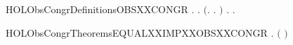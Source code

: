 \newcommand{\HOLObsCongrDate}{10 Settembre 2019}
\newcommand{\HOLObsCongrTime}{11:04}
\begin{SaveVerbatim}{HOLObsCongrDefinitionsOBSXXCONGR}
\HOLTokenTurnstile{} \HOLSymConst{\HOLTokenForall{}} .
          \HOLSymConst{\HOLTokenEquiv{}}
       \HOLSymConst{\HOLTokenForall{}}.
           \ensuremath{(}\HOLSymConst{\HOLTokenForall{}}.  \HOLTokenTransBegin{}\HOLTokenTransEnd {} \HOLSymConst{\HOLTokenImp{}} \HOLSymConst{\HOLTokenExists{}}.  \HOLTokenWeakTransBegin{}\HOLTokenWeakTransEnd {} \HOLSymConst{\HOLTokenConj{}}   \ensuremath{)} \HOLSymConst{\HOLTokenConj{}}
           \HOLSymConst{\HOLTokenForall{}}.  \HOLTokenTransBegin{}\HOLTokenTransEnd {} \HOLSymConst{\HOLTokenImp{}} \HOLSymConst{\HOLTokenExists{}}.  \HOLTokenWeakTransBegin{}\HOLTokenWeakTransEnd {} \HOLSymConst{\HOLTokenConj{}}   
\end{SaveVerbatim}
\newcommand{\HOLObsCongrDefinitionsOBSXXCONGR}{\UseVerbatim{HOLObsCongrDefinitionsOBSXXCONGR}}
\newcommand{\HOLObsCongrDefinitions}{
\HOLDfnTag{ObsCongr}{OBS_CONGR}\HOLObsCongrDefinitionsOBSXXCONGR
}
\begin{SaveVerbatim}{HOLObsCongrTheoremsEQUALXXIMPXXOBSXXCONGR}
\HOLTokenTurnstile{} \HOLSymConst{\HOLTokenForall{}} . \ensuremath{(} \HOLSymConst{\ensuremath{=}} \ensuremath{)} \HOLSymConst{\HOLTokenImp{}}   
\end{SaveVerbatim}
\newcommand{\HOLObsCongrTheoremsEQUALXXIMPXXOBSXXCONGR}{\UseVerbatim{HOLObsCongrTheoremsEQUALXXIMPXXOBSXXCONGR}}
